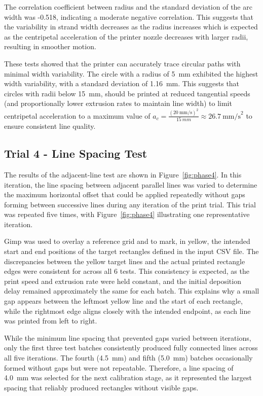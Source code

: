 The correlation coefficient between radius and the standard deviation of the arc width was -0.518, indicating a moderate negative correlation. This suggests that the variability in strand width decreases as the radius increases which is expected as the centripetal acceleration of the printer nozzle decreases with larger radii, resulting in smoother motion.

These tests showed that the printer can accurately trace circular paths with minimal width variability. The circle with a radius of 5~mm exhibited the highest width variability, with a standard deviation of 1.16~mm. This suggests that circles with radii below 15~mm, should be printed at reduced tangential speeds (and proportionally lower extrusion rates to maintain line width) to limit centripetal acceleration to a maximum value of $a_c=\frac{(20~\text{mm/s})^2}{15~mm}\approx26.7~\text{mm/s}^2$ to ensure consistent line quality.
\subsection*{Trial 4 - Line Spacing Test}
The results of the adjacent-line test are shown in Figure~\ref{fig:phase4}. In this iteration, the line spacing between adjacent parallel lines was varied to determine the maximum horizontal offset that could be applied repeatedly without gaps forming between successive lines during any iteration of the print trial. This trial was repeated five times, with Figure~\ref{fig:phase4} illustrating one representative iteration.

Gimp was used to overlay a reference grid and to mark, in yellow, the intended start and end positions of the target rectangles defined in the input CSV file. The discrepancies between the yellow target lines and the actual printed rectangle edges were consistent for across all 6 tests. This consistency is expected, as the print speed and extrusion rate were held constant, and the initial deposition delay remained approximately the same for each batch. This explains why a small gap appears between the leftmost yellow line and the start of each rectangle, while the rightmost edge aligns closely with the intended endpoint, as each line was printed from left to right.

While the minimum line spacing that prevented gaps varied between iterations, only the first three test batches consistently produced fully connected lines across all five iterations. The fourth (4.5~mm) and fifth (5.0~mm) batches occasionally formed without gaps but were not repeatable. Therefore, a line spacing of 4.0~mm was selected for the next calibration stage, as it represented the largest spacing that reliably produced rectangles without visible gaps. 

